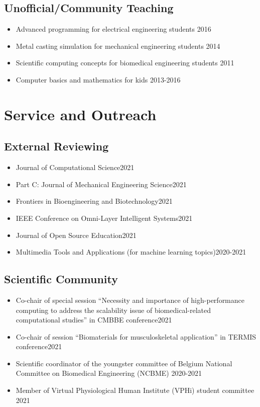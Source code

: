 \documentclass{cv}
\begin{document}
\subsection{Unofficial/Community Teaching}

\begin{itemize}
\item
Advanced programming for electrical engineering students \hfill 2016
\item
Metal casting simulation for mechanical engineering students \hfill 2014
\item
Scientific computing concepts for biomedical engineering students \hfill 2011
\item
Computer basics and mathematics for kids \hfill 2013-2016
\end{itemize}


\section{Service and Outreach}

\subsection{External Reviewing}

\begin{itemize}
\item
Journal of Computational Science\hfill 2021
\item
Part C: Journal of Mechanical Engineering Science\hfill 2021
\item
Frontiers in Bioengineering and Biotechnology\hfill 2021
\item
IEEE Conference on Omni-Layer Intelligent Systems\hfill 2021
\item
Journal of Open Source Education\hfill 2021
\item
Multimedia Tools and Applications (for machine learning topics)\hfill 2020-2021
\end{itemize}

\subsection{Scientific Community}

\begin{itemize}
\item
Co-chair of special session ``Necessity and importance of high-performance computing to address the scalability issue of biomedical-related computational studies'' in CMBBE conference\hfill 2021
\item
Co-chair of session ``Biomaterials for musculoskeletal application'' in TERMIS conference\hfill 2021
\item
Scientific coordinator of the youngster committee of Belgium National Committee on Biomedical Engineering (NCBME) \hfill 2020-2021
\item
Member of Virtual Physiological Human Institute (VPHi) student committee \hfill 2021
\end{itemize}
\end{document}
